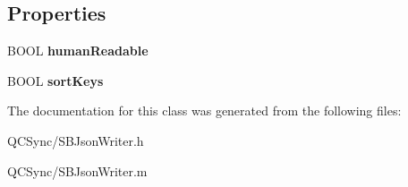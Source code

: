 \subsection*{Properties}
\begin{DoxyCompactItemize}
\item 
\hypertarget{interface_s_b_json_writer_a16ca84860a2ee76a03b567dc5181a851}{
BOOL {\bfseries humanReadable}}
\label{interface_s_b_json_writer_a16ca84860a2ee76a03b567dc5181a851}

\item 
\hypertarget{interface_s_b_json_writer_af25807a58a322b56cb5d3593532228e5}{
BOOL {\bfseries sortKeys}}
\label{interface_s_b_json_writer_af25807a58a322b56cb5d3593532228e5}

\end{DoxyCompactItemize}


The documentation for this class was generated from the following files:\begin{DoxyCompactItemize}
\item 
QCSync/SBJsonWriter.h\item 
QCSync/SBJsonWriter.m\end{DoxyCompactItemize}
